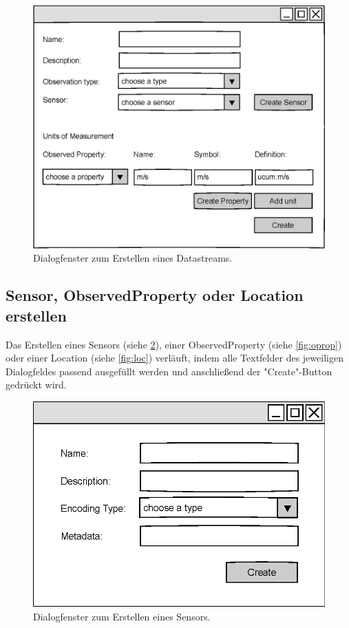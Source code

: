 \documentclass[a4paper, 12 pt]{article}
\begin{document}
\begin{figure}[htbp]
\centering
\includegraphics[scale=1]{images/datastream}
\caption{\label{fig:ds}Dialogfenster zum Erstellen eines Datastreams.}
\end{figure}

\subsection{Sensor, ObservedProperty oder Location erstellen}
Das Erstellen eines Sensors (siehe \cref{fig:sensor}), einer ObservedProperty (siehe \cref{fig:oprop}) oder einer Location (siehe \cref{fig:loc}) verläuft, indem alle Textfelder des jeweiligen Dialogfeldes passend ausgefüllt werden und anschließend der "{Create}"{-Button} gedrückt wird.

\begin{figure}[htbp]
\centering
\includegraphics[scale=1]{images/sensor}
\caption{\label{fig:sensor}Dialogfenster zum Erstellen eines Sensors.}
\end{figure}
\end{document}

